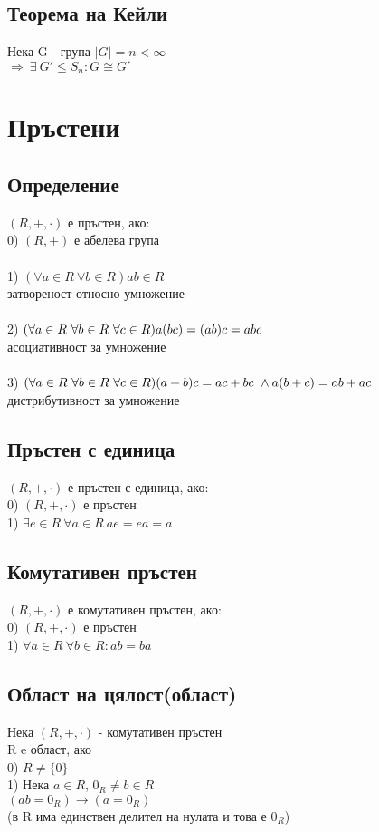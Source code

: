\documentclass[12pt]{article}
\begin{document}
\subsection{Теорема на Кейли}
Нека G - група
$|G| = n < \infty$ \\
$\Rightarrow \ \exists \ G' \leq S_n : G \cong G'$

\section{Пръстени}

\subsection{Определение}
$(R, +, \cdot)$ е пръстен, ако: \\
0) $(R, +)$ е абелева група \\\\
1) $(\forall a \in R \ \forall b \in R) ab \in R$ \\ затвореност относно умножение \\ \\
2) $(\forall a \in R \ \forall b \in R \ \forall c \in R) \\ a(bc)=(ab)c=abc$ \\ асоциативност за умножение \\ \\
3) $(\forall a \in R \ \forall b \in R \ \forall c \in R) \\ (a+b)c = ac+bc \ \land a(b+c)=ab+ac$ \\ дистрибутивност за умножение

\subsection{Пръстен с единица}
$(R, +, \cdot)$ е пръстен с единица, ако: \\
0) $(R, +, \cdot)$ е пръстен \\
1) $\exists e \in R \ \forall a \in R \ ae = ea = a$

\subsection{Комутативен пръстен}
$(R, +, \cdot)$ е комутативен пръстен, ако: \\
0) $(R, +, \cdot)$ е пръстен \\
1) $\forall a \in R \ \forall b \in R : ab = ba$

\subsection{Област на цялост(област)}
Нека $(R, +, \cdot)$ - комутативен пръстен \\
R e област, ако \\
0) $R \neq \{0\}$ \\
1) Нека $a \in R$, $0_R \neq b \in R$ \\
 $(ab=0_R) \rightarrow (a=0_R) $ \\
(в R има единствен делител на нулата и това е $0_R$)
\end{document}
